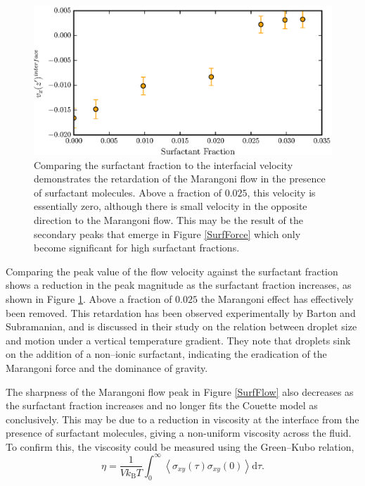 \FloatBarrier
\begin{figure}[h!]
\centering
\includegraphics[scale=1.0]{InterVel}
\caption{Comparing the surfactant fraction to the interfacial velocity demonstrates the retardation of the Marangoni flow in the presence of surfactant molecules.
Above a fraction of $0.025$, this velocity is essentially zero, although there is small velocity in the opposite direction to the Marangoni flow.
This may be the result of the secondary peaks that emerge in Figure \ref{SurfForce} which only become significant for high surfactant fractions.
}
\label{InterVel}
\end{figure}
Comparing the peak value of the flow velocity against the surfactant fraction shows a reduction in the peak magnitude as the surfactant fraction increases, as shown in Figure \ref{InterVel}.
Above a fraction of $0.025$ the Marangoni effect has effectively been removed.
This retardation has been observed experimentally by Barton and Subramanian, and is discussed in their study on the relation between droplet size and motion under a vertical  temperature gradient.\cite{BartonSubramanian} 
They note that droplets sink on the addition of a non--ionic surfactant, indicating the eradication of the Marangoni force and the dominance of gravity.

\FloatBarrier
The sharpness of the Marangoni flow peak in Figure \ref{SurfFlow} also decreases as the surfactant fraction increases and no longer fits the Couette model as conclusively.
This may be due to a reduction in viscosity at the interface from the presence of surfactant molecules, giving a non-uniform viscosity across the fluid. 
To confirm this, the viscosity could be measured using the Green--Kubo relation,
\begin{equation}
\eta = \frac{1}{V k_{\mathrm{B}} T} \int_{0}^{\infty} \left< \sigma_{xy} \left( \tau \right) \sigma_{xy}(0) \right> \mathrm{d} \tau.
\end{equation}
